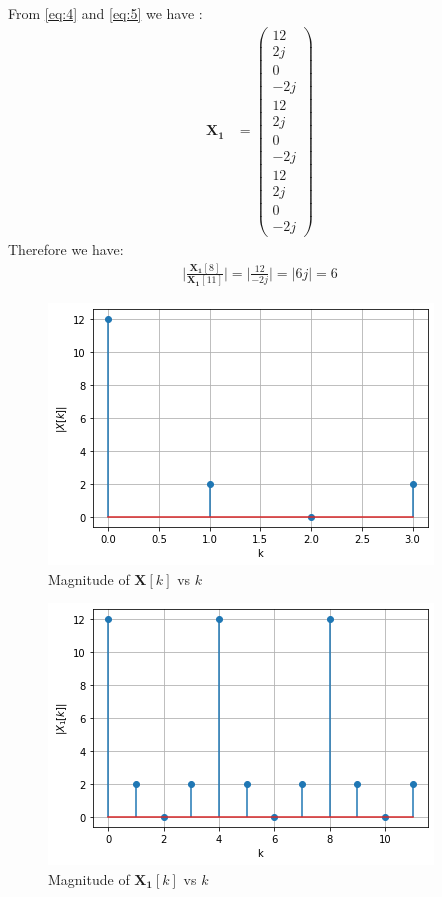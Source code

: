 \documentclass{beamer}
\newcommand{\myvec}[1]{\ensuremath{\begin{pmatrix}#1\end{pmatrix}}}
\renewcommand{\vec}[1]{\mathbf{#1}}
\begin{document}
\begin{frame}
\frametitle{}
From \eqref{eq:4} and \eqref{eq:5} we have :
\begin{align}
\vec{X_{1}} &= \myvec{12 \\ 2j \\ 0 \\ -2j \\ 12 \\ 2j \\ 0 \\ -2j \\ 12 \\ 2j \\ 0 \\-2j}
\end{align}
Therefore we have:
\begin{align}
\Big|{\frac{\vec{X_{1}}[8]}{\vec{X_{1}}[11]}}\Big| = \Big|{\frac{12}{-2j}}\Big| =\big|6j\big| = 6
\end{align}   
\end{frame}

\begin{frame}
\begin{figure}[!ht]
    \centering
    \includegraphics[width=0.9\columnwidth] {Gate_Assignment_Fig_1.png}
    \caption{Magnitude of $\vec{X}[k]$ vs $k$}
    \label{Magnitude of X[k]}
\end{figure}
\end{frame}

\begin{frame}
\begin{figure}[!ht]
    \centering
    \includegraphics[width=0.9\columnwidth] {Gate_Assignment_Fig_2.png}
    \caption{Magnitude of $\vec{X_{1}}[k]$ vs $k$}
    \label{Magnitude of X1[k]}
\end{figure}
\end{frame}
\end{document}
